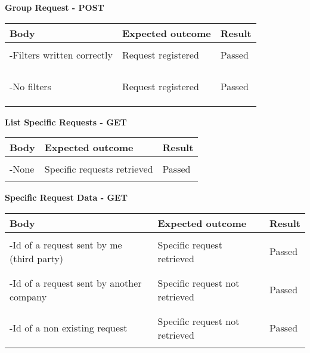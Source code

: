 \textbf{Group Request - POST}
\begin{center}
	\begin{tabular}{|p{}|p{}|p{}|}
		\hline
		Body & Expected outcome & Result \\
		\hline
		&&\\
		-Filters written correctly&Request registered&Passed\\
		&&\\
		&&\\
		&&\\
		\hline
		&&\\
		-No filters &Request registered&Passed\\
		&&\\
		&&\\
		&&\\
		\hline
	\end{tabular}
\end{center}
\textbf{List Specific Requests - GET}
\begin{center}
	\begin{tabular}{|p{}|p{}|p{}|}
		\hline
		Body & Expected outcome & Result \\
		\hline
		&&\\
		-None  &Specific requests retrieved&Passed\\
		&&\\
		\hline
	\end{tabular}
\end{center}
\newpage
\textbf{Specific Request Data - GET}
\begin{center}
	\begin{tabular}{|p{}|p{}|p{}|}
		\hline
		Body & Expected outcome & Result \\
		\hline
		&&\\
		-Id of a request sent by me (third party)  &Specific request retrieved&Passed\\
		&&\\
		\hline
		&&\\
		-Id of a request sent by another company  &Specific request not retrieved&Passed\\
		&&\\
		\hline
		&&\\
		-Id of a non existing request  &Specific request not retrieved&Passed\\
		&&\\
		\hline
	\end{tabular}
\end{center}
